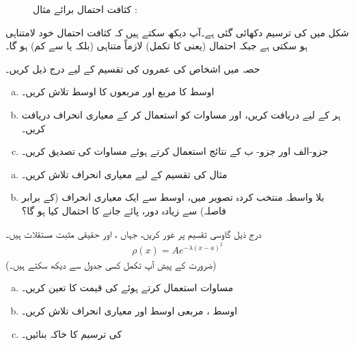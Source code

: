 \begin{figure}
\centering
{}
\caption{کثافت احتمال برائے مثال : }
\label{شکل_تفاعل_موج_کثافت_احتمال_برائے_مثال}
\end{figure}


 شکل  میں  کی ترسیم دکھائی گئی ہے۔آپ دیکھ سکتے ہیں کہ کثافت احتمال خود لامتناہی ہو سکتی ہے جبکہ احتمال (یعنی  کا تکمل) لازماً متناہی (بلکہ  یا  سے کم) ہو گا۔


 حصہ  میں اشخاص کی عمروں کی تقسیم کے لیے درج ذیل کریں۔ 
\begin{enumerate}[a.]
\item
اوسط کا مربع  اور مربعوں کا اوسط  تلاش کریں۔ 
\item
 ہر  کے لیے  دریافت کریں، اور مساوات  کو استعمال کر کے معیاری انحراف دریافت کریں۔
\item
 جزو-الف اور جزو- ب کے نتائج استعمال کرتے ہوئے مساوات  کی تصدیق کریں۔ 
\end{enumerate}
\begin{enumerate}[a.]
\item
 مثال  کی تقسیم کے لیے معیاری انحراف تلاش کریں۔
\item
بلا واسطہ منتخب کردہ تصویر میں، اوسط سے ایک معیاری انحراف (کے برابر فاصلہ) سے زیادہ دور،  پائے جانے کا احتمال کیا ہو گا؟
\end{enumerate}
درج ذیل گاوسی تقسیم پر غور کریں، جہاں ،  اور  حقیقی مثبت مستقلات ہیں۔ 
\begin{align*}
\rho(x)=Ae^{-\lambda(x-a)^2}
\end{align*}
 (ضرورت کے پیش آپ تکمل کسی جدول سے دیکھ سکتے ہیں۔)
\begin{enumerate}[a.]
\item
مساوات استعمال کرتے ہوئے  کی قیمت کا تعین کریں۔
\item
اوسط ، مربعی اوسط  اور معیاری انحراف  تلاش کریں۔
\item
{} کی ترسیم کا خاکہ بنائیں۔
\end{enumerate}

